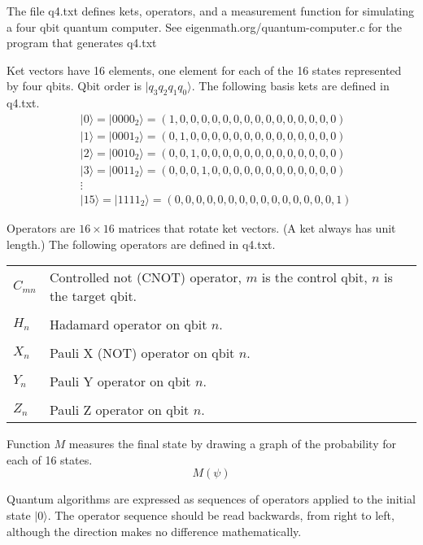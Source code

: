\documentclass[12pt]{article}
\begin{document}
\noindent
The file q4.txt defines kets, operators, and a measurement function
for simulating a four qbit quantum computer.
See eigenmath.org/quantum-computer.c for the program that generates q4.txt

\bigskip
\noindent
Ket vectors have 16 elements, one element for each of the 16 states represented by four qbits.
Qbit order is $|q_3 q_2 q_1 q_0\rangle$.
The following basis kets are defined in q4.txt.
\begin{align*}
&|0\rangle=|0000_2\rangle=(1,0,0,0,0,0,0,0,0,0,0,0,0,0,0,0)
\\
&|1\rangle=|0001_2\rangle=(0,1,0,0,0,0,0,0,0,0,0,0,0,0,0,0)
\\
&|2\rangle=|0010_2\rangle=(0,0,1,0,0,0,0,0,0,0,0,0,0,0,0,0)
\\
&|3\rangle=|0011_2\rangle=(0,0,0,1,0,0,0,0,0,0,0,0,0,0,0,0)
\\
&\vdots
\\
&|15\rangle=|1111_2\rangle=(0,0,0,0,0,0,0,0,0,0,0,0,0,0,0,1)
\end{align*}

\noindent
Operators are $16\times16$ matrices that rotate ket vectors.
(A ket always has unit length.)
The following operators are defined in q4.txt.

\bigskip
\begin{tabular}{l l}
$C_{mn}$ & Controlled not (CNOT) operator, $m$ is the control qbit, $n$ is the target qbit.
\\
\\
$H_n$ & Hadamard operator on qbit $n$.
\\
\\
$X_n$ & Pauli X (NOT) operator on qbit $n$.
\\
\\
$Y_n$ & Pauli Y operator on qbit $n$.
\\
\\
$Z_n$ & Pauli Z operator on qbit $n$.
\end{tabular}

\bigskip
\noindent
Function $M$ measures the final state by drawing a graph of the probability
for each of 16 states.
\begin{equation*}
M(\psi)
\end{equation*}

\noindent
Quantum algorithms are expressed as sequences of operators applied
to the initial state $|0\rangle$.
The operator sequence should be read backwards, from right to left,
although the direction makes no difference mathematically.
\end{document}
